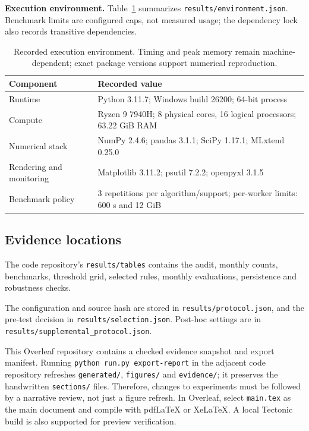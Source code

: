 \textbf{Execution environment.} Table~\ref{tab:environment} summarizes \nolinkurl{results/environment.json}. Benchmark limits are configured caps, not measured usage; the dependency lock also records transitive dependencies.
\begin{table}[!htbp]
\centering\small
\begin{tabularx}{\textwidth}{@{}lX@{}}
\toprule
Component & Recorded value\\
\midrule
Runtime & Python 3.11.7; Windows build 26200; 64-bit process\\
Compute & Ryzen 9 7940H; 8 physical cores, 16 logical processors; 63.22 GiB RAM\\
Numerical stack & NumPy 2.4.6; pandas 3.1.1; SciPy 1.17.1; MLxtend 0.25.0\\
Rendering and monitoring & Matplotlib 3.11.2; psutil 7.2.2; openpyxl 3.1.5\\
Benchmark policy & 3 repetitions per algorithm/support; per-worker limits: 600 s and 12 GiB\\
\bottomrule
\end{tabularx}
\caption{Recorded execution environment. Timing and peak memory remain machine-dependent; exact package versions support numerical reproduction.}
\label{tab:environment}
\end{table}

\subsection*{Evidence locations}
The code repository's \texttt{results/tables} contains the audit, monthly counts, benchmarks, threshold grid, selected rules, monthly evaluations, persistence and robustness checks.

The configuration and source hash are stored in \texttt{results/protocol.json}, and the pre-test decision in \texttt{results/selection.json}. Post-hoc settings are in \texttt{results/supplemental\_protocol.json}.

This Overleaf repository contains a checked evidence snapshot and export manifest. Running \texttt{python run.py export-report} in the adjacent code repository refreshes \texttt{generated/}, \texttt{figures/} and \texttt{evidence/}; it preserves the handwritten \texttt{sections/} files. Therefore, changes to experiments must be followed by a narrative review, not just a figure refresh. In Overleaf, select \texttt{main.tex} as the main document and compile with pdfLaTeX or XeLaTeX. A local Tectonic build is also supported for preview verification.


